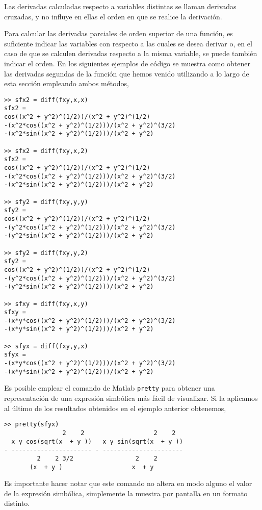Las derivadas calculadas respecto a variables distintas se llaman derivadas cruzadas, y no influye en ellas el orden en que se realice la derivación.

Para calcular las derivadas parciales de orden superior de una función, es suficiente indicar las variables con respecto a las cuales se desea derivar o, en el caso de que se calculen derivadas respecto a la misma variable, se puede también indicar el orden. En los siguientes ejemplos de código se muestra como obtener las derivadas segundas de la función que hemos venido utilizando a lo largo de esta sección empleando ambos métodos,
\begin{verbatim}
>> sfx2 = diff(fxy,x,x) 
sfx2 = 
cos((x^2 + y^2)^(1/2))/(x^2 + y^2)^(1/2)
-(x^2*cos((x^2 + y^2)^(1/2)))/(x^2 + y^2)^(3/2)
-(x^2*sin((x^2 + y^2)^(1/2)))/(x^2 + y^2)
 
>> sfx2 = diff(fxy,x,2) 
sfx2 = 
cos((x^2 + y^2)^(1/2))/(x^2 + y^2)^(1/2)
-(x^2*cos((x^2 + y^2)^(1/2)))/(x^2 + y^2)^(3/2)
-(x^2*sin((x^2 + y^2)^(1/2)))/(x^2 + y^2)
 
>> sfy2 = diff(fxy,y,y) 
sfy2 = 
cos((x^2 + y^2)^(1/2))/(x^2 + y^2)^(1/2)
-(y^2*cos((x^2 + y^2)^(1/2)))/(x^2 + y^2)^(3/2)
-(y^2*sin((x^2 + y^2)^(1/2)))/(x^2 + y^2)
 
>> sfy2 = diff(fxy,y,2) 
sfy2 = 
cos((x^2 + y^2)^(1/2))/(x^2 + y^2)^(1/2)
-(y^2*cos((x^2 + y^2)^(1/2)))/(x^2 + y^2)^(3/2) 
-(y^2*sin((x^2 + y^2)^(1/2)))/(x^2 + y^2)
 
>> sfxy = diff(fxy,x,y) 
sfxy = 
-(x*y*cos((x^2 + y^2)^(1/2)))/(x^2 + y^2)^(3/2)
-(x*y*sin((x^2 + y^2)^(1/2)))/(x^2 + y^2)
 
>> sfyx = diff(fxy,y,x) 
sfyx = 
-(x*y*cos((x^2 + y^2)^(1/2)))/(x^2 + y^2)^(3/2)
-(x*y*sin((x^2 + y^2)^(1/2)))/(x^2 + y^2) 
\end{verbatim}

Es posible emplear el comando de Matlab \texttt{pretty} para obtener una representación de una expresión simbólica más fácil de visualizar. Si la aplicamos al último de los resultados obtenidos en el ejemplo anterior obtenemos,

\begin{verbatim}
>> pretty(sfyx)
                2    2                   2    2
  x y cos(sqrt(x  + y ))   x y sin(sqrt(x  + y ))
- ---------------------- - ----------------------
         2    2 3/2                 2    2
       (x  + y )                   x  + y
\end{verbatim}

Es importante hacer notar que este comando no altera en modo alguno el valor de la expresión simbólica, simplemente la muestra por pantalla en un formato distinto.


